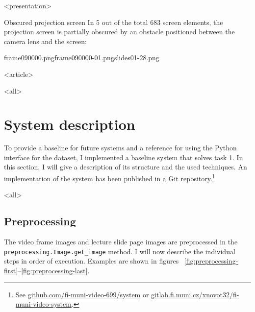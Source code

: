 \begin{description}
\mode
<presentation>

  \begin{frame}{Obscured projection screen}
    In 5 out of the total 683 screen elements,
    the projection screen is partially obscured by an obstacle positioned
    between the camera lens and the screen:

      {frame090000.png}{frame090000-01.png}{slides01-28.png}%
  \end{frame}

\mode
<article>
\end{description}

\FloatBarrier
\mode
<all>{%
\section{System description}
\label{sec:system-description}}
To provide a baseline for future systems and a reference for using the Python
interface for the dataset, I implemented a baseline system that solves task 1.
In this section, I will give a description of its structure and the used
techniques.  An implementation of the system has been published in a Git
repository.\footnote{See
  \href{https://github.com/fi-muni-video-699/system}%
       {github.com/fi-muni-video-699/system} or
  \href{https://gitlab.fi.muni.cz/xnovot32/fi-muni-video-system}%
       {gitlab.fi.muni.cz/xnovot32/fi-muni-video-system}.}

\mode
<all>{%
\subsection{Preprocessing}
\label{sec:preprocessing}}
The video frame images and lecture slide page images are preprocessed in the
\texttt{preprocessing.Image.get\_image} method. I will now describe the
individual steps in order of execution. Examples are shown in figures~%
\ref{fig:preprocessing-first}--\ref{fig:preprocessing-last}.

